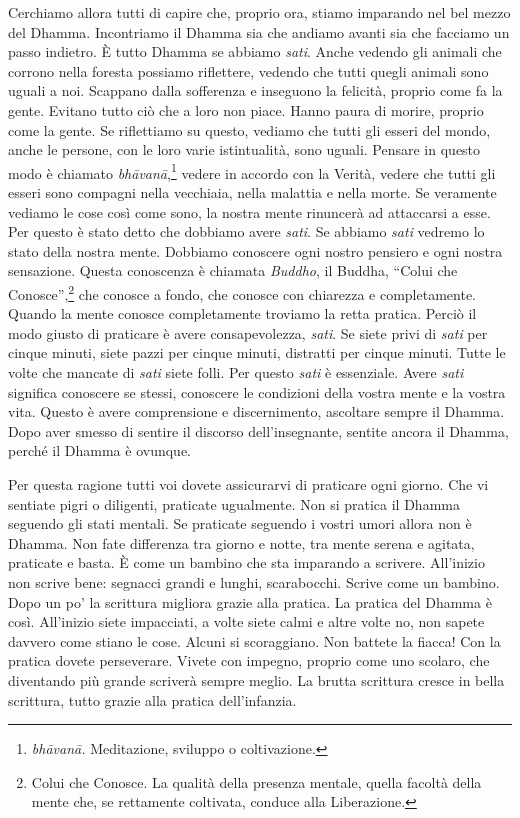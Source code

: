 Cerchiamo allora tutti di capire che, proprio ora, stiamo imparando nel
bel mezzo del Dhamma. Incontriamo il Dhamma sia che andiamo avanti sia
che facciamo un passo indietro. È tutto Dhamma se abbiamo \emph{sati}.
Anche vedendo gli animali che corrono nella foresta possiamo riflettere,
vedendo che tutti quegli animali sono uguali a noi. Scappano dalla
sofferenza e inseguono la felicità, proprio come fa la gente. Evitano
tutto ciò che a loro non piace. Hanno paura di morire, proprio come la
gente. Se riflettiamo su questo, vediamo che tutti gli esseri del mondo,
anche le persone, con le loro varie istintualità, sono uguali. Pensare
in questo modo è chiamato \emph{bhāvanā},\footnote{\emph{bhāvanā.}
  Meditazione, sviluppo o coltivazione.} vedere in accordo con la
Verità, vedere che tutti gli esseri sono compagni nella vecchiaia, nella
malattia e nella morte. Se veramente vediamo le cose così come sono, la
nostra mente rinuncerà ad attaccarsi a esse. Per questo è stato detto
che dobbiamo avere \emph{sati}. Se abbiamo \emph{sati} vedremo lo stato
della nostra mente. Dobbiamo conoscere ogni nostro pensiero e ogni
nostra sensazione. Questa conoscenza è chiamata \emph{Buddho}, il
Buddha, ``Colui che Conosce'',\footnote{Colui che Conosce. La qualità
  della presenza mentale, quella facoltà della mente che, se rettamente
  coltivata, conduce alla Liberazione.} che conosce a fondo, che conosce
con chiarezza e completamente. Quando la mente conosce completamente
troviamo la retta pratica. Perciò il modo giusto di praticare è avere
consapevolezza, \emph{sati}. Se siete privi di \emph{sati} per cinque
minuti, siete pazzi per cinque minuti, distratti per cinque minuti.
Tutte le volte che mancate di \emph{sati} siete folli. Per questo
\emph{sati} è essenziale. Avere \emph{sati} significa conoscere se
stessi, conoscere le condizioni della vostra mente e la vostra vita.
Questo è avere comprensione e discernimento, ascoltare sempre il Dhamma.
Dopo aver smesso di sentire il discorso dell'insegnante, sentite ancora
il Dhamma, perché il Dhamma è ovunque.

Per questa ragione tutti voi dovete assicurarvi di praticare ogni
giorno. Che vi sentiate pigri o diligenti, praticate ugualmente. Non si
pratica il Dhamma seguendo gli stati mentali. Se praticate seguendo i
vostri umori allora non è Dhamma. Non fate differenza tra giorno e
notte, tra mente serena e agitata, praticate e basta. È come un bambino
che sta imparando a scrivere. All'inizio non scrive bene: segnacci
grandi e lunghi, scarabocchi. Scrive come un bambino. Dopo un po' la
scrittura migliora grazie alla pratica. La pratica del Dhamma è così.
All'inizio siete impacciati, a volte siete calmi e altre volte no, non
sapete davvero come stiano le cose. Alcuni si scoraggiano. Non battete
la fiacca! Con la pratica dovete perseverare. Vivete con impegno,
proprio come uno scolaro, che diventando più grande scriverà sempre
meglio. La brutta scrittura cresce in bella scrittura, tutto grazie alla
pratica dell'infanzia.

